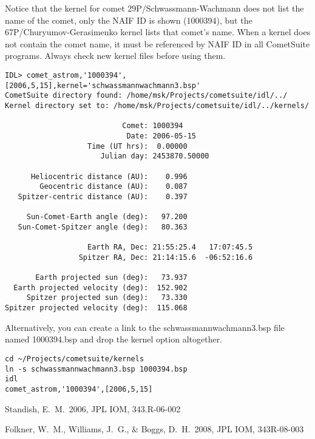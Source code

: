 \documentclass[12pt,letterpaper]{article}
\newcommand\cs{CometSuite}
\begin{document}
Notice that the kernel for comet 29P/Schwassmann-Wachmann does not
list the name of the comet, only the NAIF ID is shown (1000394), but
the 67P/Churyumov-Gerasimenko kernel lists that comet's name.  When a
kernel does not contain the comet name, it must be referenced by NAIF
ID in all \cs{} programs.  Always check new kernel files before using
them.
\begin{lstlisting}
IDL> comet_astrom,'1000394',[2006,5,15],kernel='schwassmannwachmann3.bsp'
CometSuite directory found: /home/msk/Projects/cometsuite/idl/../
Kernel directory set to: /home/msk/Projects/cometsuite/idl/../kernels/

                           Comet: 1000394
                            Date: 2006-05-15
                   Time (UT hrs):  0.00000
                      Julian day: 2453870.50000

      Heliocentric distance (AU):    0.996
        Geocentric distance (AU):    0.087
   Spitzer-centric distance (AU):    0.397

     Sun-Comet-Earth angle (deg):   97.200
   Sun-Comet-Spitzer angle (deg):   80.363

                   Earth RA, Dec: 21:55:25.4   17:07:45.5
                 Spitzer RA, Dec: 21:14:15.6  -06:52:16.6

       Earth projected sun (deg):   73.937
  Earth projected velocity (deg):  152.902
     Spitzer projected sun (deg):   73.330
Spitzer projected velocity (deg):  115.068
\end{lstlisting}
Alternatively, you can create a link to the schwassmannwachmann3.bsp
file named 1000394.bsp and drop the kernel option altogether.
\begin{lstlisting}
cd ~/Projects/cometsuite/kernels
ln -s schwassmannwachmann3.bsp 1000394.bsp
idl
comet_astrom,'1000394',[2006,5,15]
\end{lstlisting}

\begin{thebibliography}{}
 Standish, E.~M.\ 2006,
JPL IOM, 343.R-06-002

 Folkner, W.~M., Williams,
  J.~G., \& Boggs, D.~H.\ 2008, JPL IOM, 343R-08-003

\end{thebibliography}
\end{document}
